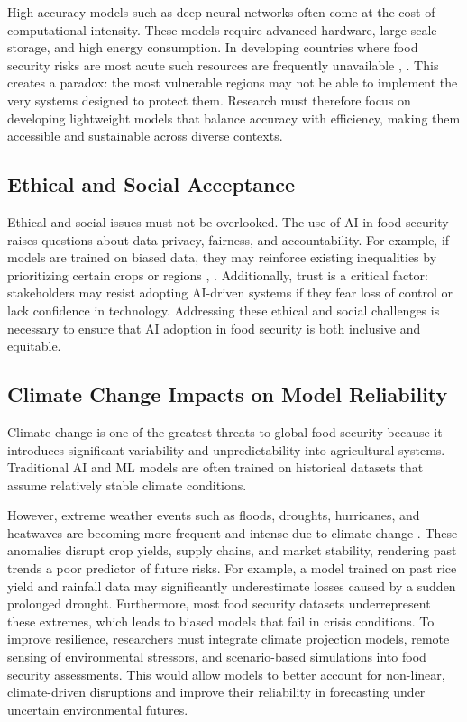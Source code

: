 \documentclass[preprint,12pt]{elsarticle}
\begin{document}
	High-accuracy models such as deep neural networks often come at the cost
	of computational intensity. These models require advanced hardware,
	large-scale storage, and high energy consumption. In developing
	countries where food security risks are most acute such resources are
	frequently unavailable \cite{ref62}, \cite{ref63}. This creates a paradox: the most
	vulnerable regions may not be able to implement the very systems
	designed to protect them. Research must therefore focus on developing
	lightweight models that balance accuracy with efficiency, making them
	accessible and sustainable across diverse contexts.
	
	\subsection{Ethical and Social Acceptance}
	
	Ethical and social issues must not be overlooked. The use of AI in food
	security raises questions about data privacy, fairness, and
	accountability. For example, if models are trained on biased data, they
	may reinforce existing inequalities by prioritizing certain crops or
	regions \cite{ref61}, \cite{ref4}. Additionally, trust is a critical factor:
	stakeholders may resist adopting AI-driven systems if they fear loss of
	control or lack confidence in technology. Addressing these ethical and
	social challenges is necessary to ensure that AI adoption in food
	security is both inclusive and equitable.
	
	\subsection{Climate Change Impacts on Model Reliability}
	
	Climate change is one of the greatest threats to global food security
	because it introduces significant variability and unpredictability into
	agricultural systems. Traditional AI and ML models are often trained on
	historical datasets that assume relatively stable climate conditions.
	
	However, extreme weather events such as floods, droughts, hurricanes,
	and heatwaves are becoming more frequent and intense due to climate
	change \cite{ref84}. These anomalies disrupt crop yields, supply chains, and
	market stability, rendering past trends a poor predictor of future
	risks. For example, a model trained on past rice yield and rainfall data
	may significantly underestimate losses caused by a sudden prolonged
	drought. Furthermore, most food security datasets underrepresent these
	extremes, which leads to biased models that fail in crisis conditions.
	To improve resilience, researchers must integrate climate projection
	models, remote sensing of environmental stressors, and scenario-based
	simulations into food security assessments. This would allow models to
	better account for non-linear, climate-driven disruptions and improve
	their reliability in forecasting under uncertain environmental futures.
	
\end{document}
